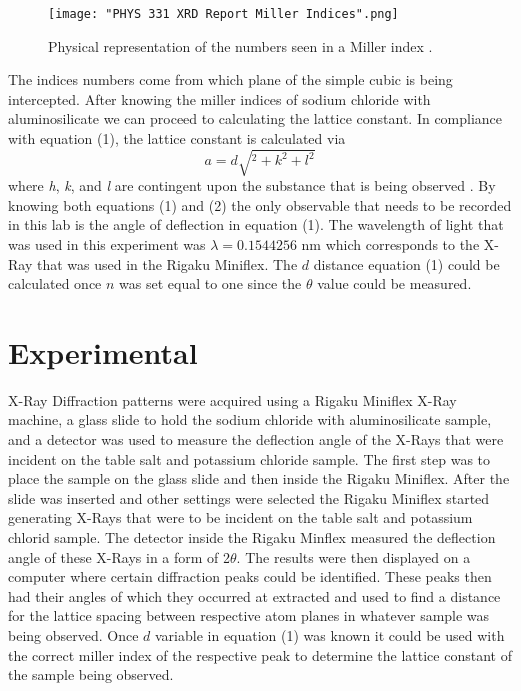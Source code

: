 \documentclass[twocolumn]{article}
\begin{document}
\begin{figure}[htbp]
\begin{center}
\texttt{[image: "PHYS 331 XRD Report Miller Indices".png]}
\caption{Physical representation of the numbers seen in a Miller index \cite{WikiCrystal}.}
\label{Fig3}
\end{center}
\end{figure}
\newpage
The indices numbers come from which plane of the simple cubic is being intercepted. After knowing the miller indices of sodium chloride with aluminosilicate we can proceed to calculating the lattice constant. In compliance with equation (1), the lattice constant is calculated via
\begin{equation}\label{2}
a=d\sqrt{^2+k^2+l^2}
\end{equation}
where \textit{h}, \textit{k}, and \textit{l} are contingent upon the substance that is being observed \cite{X-RayCryst}. By knowing both equations (1) and (2) the only observable that needs to be recorded in this lab is the angle of deflection in equation (1). The wavelength of light that was used in this experiment was $\lambda=0.1544256$ nm which corresponds to the X-Ray that was used in the Rigaku Miniflex. The $d$ distance equation (1) could be calculated once $n$ was set equal to one since the $\theta$ value could be measured.
\section*{Experimental}
X-Ray Diffraction patterns were acquired using a Rigaku Miniflex X-Ray machine, a glass slide to hold the sodium chloride with aluminosilicate sample, and a detector was used to measure the deflection angle of the X-Rays that were incident on the table salt and potassium chloride sample. The first step was to place the sample on the glass slide and then inside the Rigaku Miniflex. After the slide was inserted and other settings were selected the Rigaku Miniflex started generating X-Rays that were to be incident on the table salt and potassium chlorid sample. The detector inside the Rigaku Minflex measured the deflection angle of these X-Rays in a form of 2$\theta$. The results were then displayed on a computer where certain diffraction peaks could be identified. These peaks then had their angles of which they occurred at extracted and used to find a distance for the lattice spacing between respective atom planes in whatever sample was being observed. Once $d$ variable in equation (1) was known it could be used with the correct miller index of the respective peak to determine the lattice constant of the sample being observed.
\end{document}
